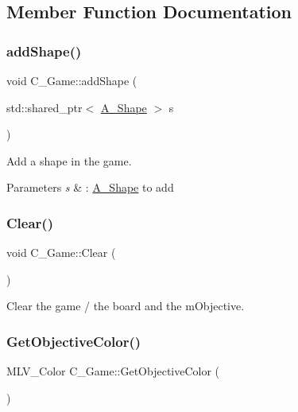 \subsection{Member Function Documentation}
\mbox{\label{classC__Game_ad2b7512192879ec7cd76d4eed4fef938}} 
\subsubsection{\texorpdfstring{add\+Shape()}{addShape()}}
{\footnotesize\ttfamily void C\+\_\+\+Game\+::add\+Shape (\begin{DoxyParamCaption}\item[{std\+::shared\+\_\+ptr$<$ \hyperlink{classA__Shape}{A\+\_\+\+Shape} $>$}]{s }\end{DoxyParamCaption})}



Add a shape in the game. 


\begin{DoxyParams}{Parameters}
{\em s} & \+: \hyperlink{classA__Shape}{A\+\_\+\+Shape} to add \\
\hline
\end{DoxyParams}
\mbox{\label{classC__Game_a1ad2e168bba0305e48c0bf8e162a889a}} 
\subsubsection{\texorpdfstring{Clear()}{Clear()}}
{\footnotesize\ttfamily void C\+\_\+\+Game\+::\+Clear (\begin{DoxyParamCaption}{ }\end{DoxyParamCaption})}



Clear the game / the board and the m\+Objective. 

\mbox{\label{classC__Game_a0efbb25a7daf4411b2dfe3055530ac85}} 
\subsubsection{\texorpdfstring{Get\+Objective\+Color()}{GetObjectiveColor()}}
{\footnotesize\ttfamily M\+L\+V\+\_\+\+Color C\+\_\+\+Game\+::\+Get\+Objective\+Color (\begin{DoxyParamCaption}{ }\end{DoxyParamCaption})}



